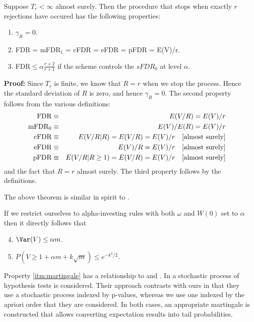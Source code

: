 \documentclass[12pt]{article}
\begin{document}
\begin{theorem}\label{thm:all:same}
Suppose $T_{r} < \infty$ almost surely.  Then the procedure that
 stops when exactly $r$ rejections have occured has the following properties:
\begin{enumerate}
\item $\gamma_R = 0$.
\item FDR = mFDR${}_1$ = cFDR = eFDR = pFDR = E(V)/r.
\item FDR$ \le \alpha \frac{r + 2}{r + 1}$ if the scheme controls the $sFDR_{0}$
 at level $\alpha$.
\end{enumerate}
\end{theorem}
{\bf Proof:}
Since $T_{r}$ is finite, we know that $R=r$ when we stop the
process.  Hence the standard deviation of $R$ is zero, and hence
$\gamma_R = 0$.  The second property follows from the various
definitions:
\begin{eqnarray*}
\hbox{FDR} &\equiv& E(V/R) = E(V)/r \\
\hbox{mFDR}_0 &\equiv& E(V)/E(R) = E(V) /r \\
\hbox{cFDR} &\equiv& E(V/R|R) =  E(V/R) = E(V)/r \quad \hbox{[almost surely]}\\
\hbox{eFDR} &\equiv& E(V)/R=  E(V)/r \quad  \hbox{[almost surely]}\\
\hbox{pFDR} &\equiv& E(V/R|R\ge 1) =  E(V/R) = E(V)/r \quad  \hbox{[almost surely]}
\end{eqnarray*}
and the fact that $R=r$ almost surely.  The third property follows by
 the definitions.

\hfill \QED

The above theorem is similar in spirit to \cite{thc03}.

If we restrict ourselves to alpha-investing rules with both $\omega$ and $W(0)$ set
 to $\alpha$ then it directly follows that
{\em
\begin{enumerate}\setcounter{enumi}{3}
\item $\Var(V) \le \alpha m$.
\item \label{itm:martingale} $P(V \ge 1 + \alpha m + k\sqrt{m}) \le e^{-k^2/2}$.
\end{enumerate}} 
%
Property \ref{itm:martingale} has a relationship to \cite{wasserman02} and
 \cite{wasserman04b}.  In \cite{wasserman04b} a stochastic process of
 hypothesis tests is considered.  Their approach contrasts with ours
 in that they use a stochastic process indexed by p-values, whereas we
 use one indexed by the apriori order that they are considered.  In
 both cases, an appropriate martingale is constructed that allows
 converting expectation results into tail probabilities.
\end{document}
